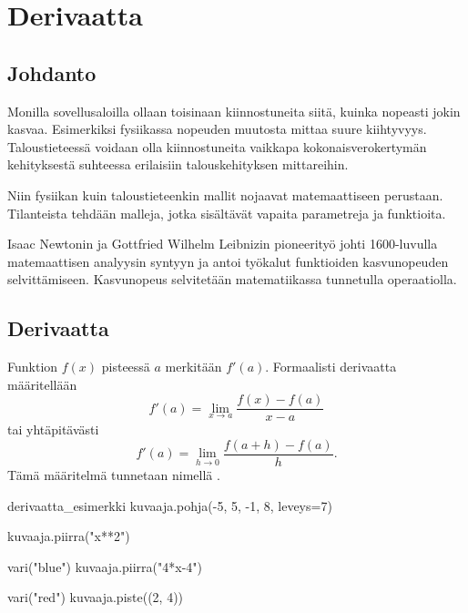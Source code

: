 \chapter{Derivaatta}


\section{Johdanto}

Monilla sovellusaloilla ollaan toisinaan kiinnostuneita siitä, kuinka nopeasti jokin kasvaa.
Esimerkiksi fysiikassa nopeuden muutosta mittaa suure kiihtyvyys. Taloustieteessä voidaan olla
kiinnostuneita vaikkapa kokonaisverokertymän kehityksestä suhteessa erilaisiin talouskehityksen mittareihin.

Niin fysiikan kuin taloustieteenkin mallit nojaavat matemaattiseen perustaan.
Tilanteista tehdään malleja, jotka sisältävät vapaita parametreja ja funktioita.

Isaac Newtonin ja Gottfried Wilhelm Leibnizin pioneerityö johti 1600-luvulla
matemaattisen analyysin syntyyn ja antoi työkalut funktioiden kasvunopeuden selvittämiseen.
Kasvunopeus selvitetään matematiikassa  tunnetulla operaatiolla.

\section{Derivaatta}

Funktion $f(x)$  pisteessä $a$ merkitään $f'(a)$.
Formaalisti derivaatta määritellään
\[ f'(a) = \lim\limits_{x \to a} \frac{f(x)-f(a)}{x-a} \]
tai yhtäpitävästi
\[ f'(a) = \lim\limits_{h \to 0} \frac{f(a+h)-f(a)}{h}. \]
Tämä määritelmä tunnetaan nimellä .

\begin{luoKuva}{derivaatta_esimerkki}
    kuvaaja.pohja(-5, 5, -1, 8, leveys=7)
    
    kuvaaja.piirra("x**2")
    
    vari("blue")
    kuvaaja.piirra("4*x-4")
   
    vari("red")
    kuvaaja.piste((2, 4))
\end{luoKuva}

